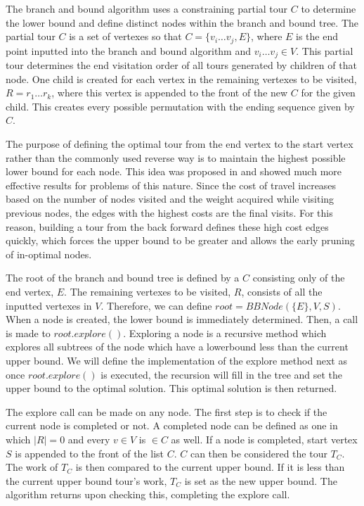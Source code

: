 \documentclass[sigconf, anonymous, pdftex]{acmart}
\begin{document}
The branch and bound algorithm uses a constraining partial tour $C$ to determine the lower bound and define distinct nodes within the branch and bound tree. The partial tour $C$ is a set of vertexes so that $C = \{v_i \dots v_j, E\}$, where $E$ is the end point inputted into the branch and bound algorithm and $v_i \dots v_j \in V$. This partial tour determines the end visitation order of all tours generated by children of that node. One child is created for each vertex in the remaining vertexes to be visited, $R = r_1 \dots r_k$, where this vertex is appended to the front of the new $C$ for the given child. This creates every possible permutation with the ending sequence given by $C$.

The purpose of defining the optimal tour from the end vertex to the start vertex rather than the commonly used reverse way is to maintain the highest possible lower bound for each node. This idea was proposed in \cite{bbTardyMachine} and showed much more effective results for problems of this nature. Since the cost of travel increases based on the number of nodes visited and the weight acquired while visiting previous nodes, the edges with the highest costs are the final visits. For this reason, building a tour from the back forward defines these high cost edges quickly, which forces the upper bound to be greater and allows the early pruning of in-optimal nodes.

The root of the branch and bound tree is defined by a $C$ consisting only of the end vertex, $E$. The remaining vertexes to be visited, $R$, consists of all the inputted vertexes in $V$. Therefore, we can define $root = BBNode(\{E\}, V, S)$. When a node is created, the lower bound is immediately determined. Then, a call is made to $root.explore()$. Exploring a node is a recursive method which explores all subtrees of the node which have a lowerbound less than the current upper bound. We will define the implementation of the explore method next as once $root.explore()$ is executed, the recursion will fill in the tree and set the upper bound to the optimal solution. This optimal solution is then returned.

The explore call can be made on any node. The first step is to check if the current node is completed or not. A completed node can be defined as one in which $|R| = 0$ and every $v \in V$ is $\in C$ as well. If a node is completed, start vertex $S$ is appended to the front of the list $C$. $C$ can then be considered the tour $T_C$. The work of $T_C$ is then compared to the current upper bound. If it is less than the current upper bound tour's work, $T_C$ is set as the new upper bound. The algorithm returns upon checking this, completing the explore call.
\end{document}
